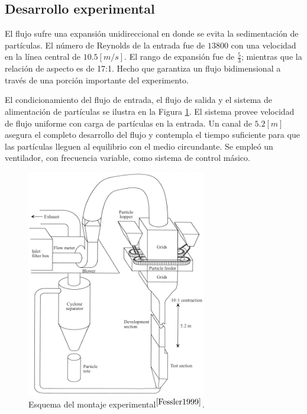 \noindent
\justify

\subsection{Desarrollo experimental}

\noindent
\justify

El flujo sufre una expansi\'on unidireccional en donde se evita la sedimentaci\'on de part\'iculas. El n\'umero de Reynolds de la entrada fue de $13800$ con una velocidad en la l\'inea central de $10.5 [m/s]$. El rango de expansi\'on fue de $\frac{5}{3}$; mientras que la relaci\'on de aspecto es de 17:1. Hecho que garantiza un flujo bidimensional a trav\'es de una porci\'on importante del experimento.

\noindent
\justify

El condicionamiento del flujo de entrada, el flujo de salida y el sistema de alimentaci\'on de part\'iculas se ilustra en la Figura \ref{experimento}. El sistema provee velocidad de flujo uniforme con carga de part\'iculas en la entrada. Un canal de $5.2 [m]$ asegura el completo desarrollo del flujo y contempla el tiempo suficiente para que las part\'iculas lleguen al equilibrio con el medio circundante. Se emple\'o un ventilador, con frecuencia variable, como sistema de control m\'asico.

\begin{figure}[h!]
	\centering
	\includegraphics[width=0.7\textwidth]{Images/experimento.png}
	\caption{Esquema del montaje experimental$^{\cite{Fessler1999}}$.}
	\label{experimento}
\end{figure}

